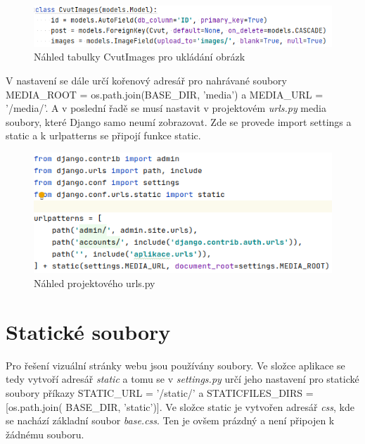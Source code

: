 \begin{figure}[H] \centering
    \includegraphics[width=430pt]{./pictures/9-db-cvutimages.PNG}
    \caption[Náhled tabulky CvutImages pro ukládání obrázků]{Náhled tabulky CvutImages pro ukládání obrázk}
	\label{fig:Náhled tabulky CvutImages pro ukládání obrázk}              
\end{figure}


V nastavení se dále určí kořenový adresář pro nahrávané soubory
MEDIA\_ROOT = os.path.join(BASE\_DIR, 'media') a
MEDIA\_URL = '/media/'.  A v poslední řadě se musí nastavit v
projektovém \emph{urls.py} media soubory, které Django samo neumí
zobrazovat. Zde se provede import settings a static a k urlpatterns se
připojí funkce static.

\begin{figure}[H] \centering
    \includegraphics[width=380pt]{./pictures/10-media-urlspy.PNG}
    \caption[Náhled projektového urls.py]{Náhled projektového urls.py}
	\label{fig:Náhled projektového urls.py}              
\end{figure}

\newpage

\section{Statické soubory}

Pro řešení vizuální stránky webu jsou používány  soubory. Ve složce
aplikace se tedy vytvoří adresář \emph{static} a tomu se v \emph{settings.py} 
určí jeho nastavení pro statické soubory příkazy STATIC\_URL =
  '/static/' a STATICFILES\_DIRS = [os.path.join( BASE\_DIR,
    'static')]. Ve složce static je vytvořen adresář \emph{css}, kde se
nachází zá\-kladní  soubor \emph{base.css}. Ten je ovšem prázdný a není
připojen k žádnému  souboru.

